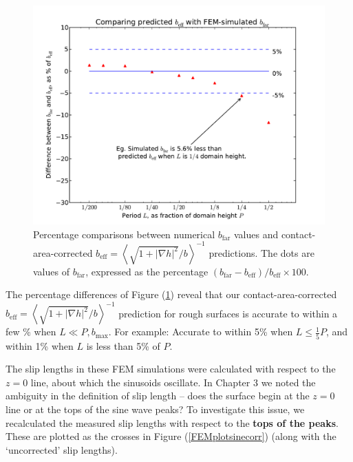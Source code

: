 \documentclass[12pt, a4paper, twoside, openright]{book}
\newcommand{\beff}{\ensuremath{b_{\mathrm{eff}}}}
\newcommand{\bmax}{\ensuremath{b_{\mathrm{max}}}}
\newcommand{\bfar}{\ensuremath{b_{\mathrm{far}}}}
\newcommand{\beffha}{\ensuremath{b_{\mathrm{eff}}} = \left< \sqrt{1 + |\nabla h|^2} / {b} \right>^{-1} }
\begin{document}
\clearpage
\begin{figure}[ht]
\includegraphics[scale=0.595]{Lund_Thesis_FEM_plot_sine_pcnt}
\caption{Percentage comparisons between numerical $\bfar$ values and contact-area-corrected $\beffha$ predictions. The dots are values of $\bfar$, expressed as the percentage $(\bfar -\beff)/\beff \times 100 $. }\label{FEMplotsinepcnt}
\end{figure}

The percentage differences of Figure (\ref{FEMplotsinepcnt}) reveal that our contact-area-corrected $\beffha$ prediction for rough surfaces is accurate to within a few \% when $L \ll P, \bmax$.
For example: Accurate to within 5\% when $L \leq \frac{1}{5}P$, and within 1\% when $L$ is less than 5\% of $P$.

The slip lengths in these FEM simulations were calculated with respect to the $z=0$ line, about which the sinusoids oscillate.  In Chapter 3 we noted the ambiguity in the definition of slip length -- does the surface begin at the $z=0$ line or at the tops of the sine wave peaks?  To investigate this issue, we recalculated the measured slip lengths with respect to the \textbf{tops of the peaks}.  These are plotted as the crosses in Figure (\ref{FEMplotsinecorr}) (along with the `uncorrected' slip lengths).
\end{document}
